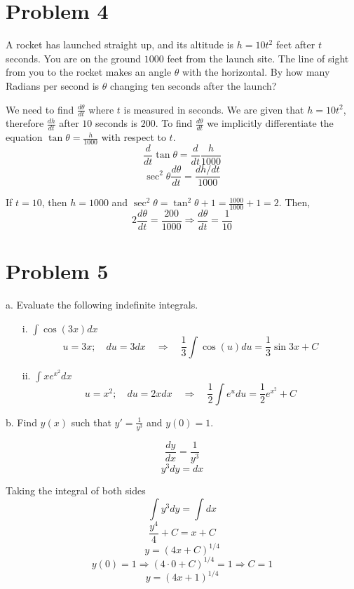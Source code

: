 \documentclass{article}
\begin{document}
\section{Problem 4}
\begin{tcolorbox}
     A rocket has launched straight up, and its altitude is $h = 10t^2$ feet after $t$ seconds. You are on the ground $1000$ feet from the launch site. The line of sight from you to the rocket makes an angle $\theta$ with the horizontal. By how many Radians per second is $\theta$ changing ten seconds after the launch? 
\end{tcolorbox}
\newpage
\begin{figure}[htp!]
    \centering
    
    \label{fig:fig2}
\end{figure}
We need to find $\frac{d\theta}{dt}$ where $t$ is measured in seconds. We are given that $h = 10t^2$, therefore $\frac{dh}{dt}$ after $10$ seconds is $200$. To find $\frac{d\theta}{dt}$ we implicitly differentiate the equation $\tan{\theta} = \frac{h}{1000}$ with respect to $t$.
\[ \frac{d}{dt} \tan{\theta} = \frac{d}{dt} \frac{h}{1000} \]
\[ \sec^2{\theta}\frac{d\theta}{dt} = \frac{dh/dt}{1000} \]
\par If $t = 10$, then $h = 1000$ and $\sec^2{\theta} = \tan^2{\theta} + 1 = \frac{1000}{1000} + 1 = 2$. Then,
\[ 2\frac{d\theta}{dt} = \frac{200}{1000} \Rightarrow \frac{d\theta}{dt} = \frac{1}{10} \]

\section{Problem 5}
\begin{tcolorbox}
    a. Evaluate the following indefinite integrals.
\end{tcolorbox}
\begin{itemize}
    \item[i.] $\int{\cos(3x)dx}$
    \[ u = 3x; \quad du = 3dx \quad \Rightarrow \quad \frac{1}{3}\int{\cos{(u)}du} = \frac{1}{3}\sin{3x} + C \]
    \item[ii.] $\int{xe^{x^2}dx}$
    \[ u = x^2; \quad du = 2xdx \quad \Rightarrow \quad \frac{1}{2}\int{e^udu} = \frac{1}{2}e^{x^2} + C \]
\end{itemize}
\begin{tcolorbox}
    b. Find $y(x)$ such that $y' = \frac{1}{y^3}$ and $y(0) = 1$.
\end{tcolorbox}
\[ \frac{dy}{dx} = \frac{1}{y^3} \]
\[ y^3dy = dx \]

\par Taking the integral of both sides
\[ \int{y^3dy} = \int{dx} \]
\[ \frac{y^4}{4} + C = x + C \]
\[ y = (4x + C)^{1/4} \]
\[ y(0) = 1 \Rightarrow (4 \cdot 0 + C)^{1/4} = 1 \Rightarrow C = 1  \]
\[ y = (4x + 1)^{1/4} \]
\end{document}
